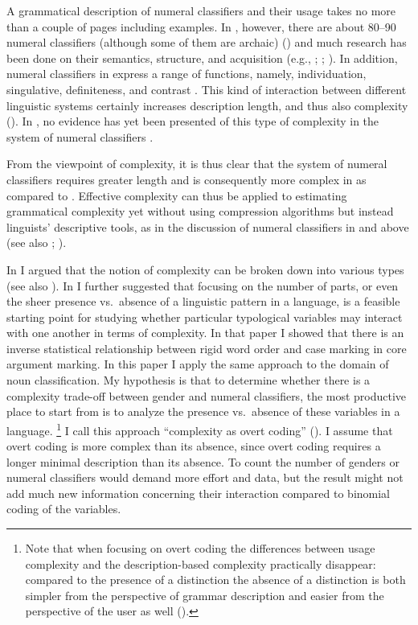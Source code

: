 \documentclass[output=collectionpaper]{langsci/langscibook}
\begin{document}
A grammatical description of  numeral classifiers and their usage takes no more than a couple of pages including examples. In , however, there are about 80--90 numeral classifiers (although some of them are archaic) (\citealt[74]{Iwasaki2005}) and much research has been done on their semantics, structure, and acquisition  (e.g., \citealt{Hundius1983}; \citealt{Gandour1984}; \citealt{Inglis2003}). In addition, numeral classifiers in  express a range of functions, namely, individuation, singulative, definiteness, and contrast \citep{Bisang2009}. This kind of interaction between different linguistic systems certainly increases description length, and thus also complexity (\citealt{Sinnemaeki2014}). In , no evidence has yet been presented of this type of complexity in the system of numeral classifiers \citep[360--368]{Ring2015}.

From the viewpoint of complexity, it is thus clear that the system of numeral classifiers requires greater length \textendash{} and is consequently more complex \textendash{} in  as compared to . Effective complexity can thus be applied to estimating grammatical complexity yet without using compression algorithms but instead linguists' descriptive tools, as in the discussion of numeral classifiers in  and  above (see also \citealt{Miestamo2008}; \citealt{Sinnemaeki2014}).

In \citet{Sinnemaeki2011} I argued that the notion of complexity can be broken down into various types (see also \citealt{Good2012}). In \citet{Sinnemaeki2014} I further suggested that focusing on the number of parts, or even the sheer presence vs.\ absence of a linguistic pattern in a language, is a feasible starting point for studying whether particular typological variables may interact with one another in terms of complexity. In that paper I showed that there is an inverse statistical relationship between rigid word order and case marking in core argument marking. In this paper I apply the same approach to the domain of noun classification. My hypothesis is that to determine whether there is a complexity trade-off between gender and numeral classifiers, the most productive place to start from is to analyze the presence vs.\ absence of these variables in a language.%
\footnote{Note that when focusing on overt coding the differences between usage complexity and the description-based complexity practically disappear: compared to the presence of a distinction the absence of a distinction is both simpler from the perspective of grammar description and easier from the perspective of the user as well (\citealt[127--128]{Sinnemaeki2009}).} %
I call this approach ``complexity as overt coding'' (\citealt{Sinnemaeki2014}). I assume that overt coding is more complex than its absence, since overt coding requires a longer minimal description than its absence. To count the number of genders or numeral classifiers would demand more effort and data, but the result might not add much new information concerning their interaction compared to binomial coding of the variables.
\end{document}
